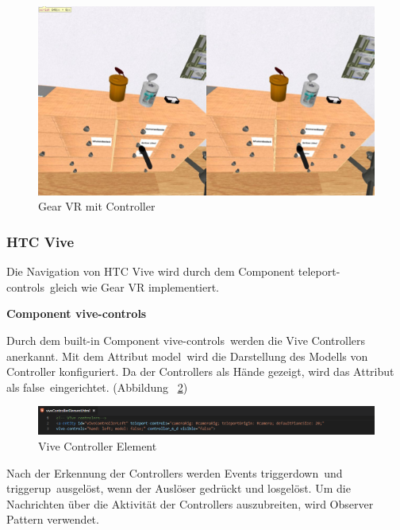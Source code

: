 \begin{figure}[ht]
\vspace*{0.3cm}
\centering
\includegraphics[width=\textwidth]{images/gearVRWithController.png}
\caption[Gear VR mit Controller]{Gear VR mit Controller}
\label{fig:GearVRWithController} 
\end{figure}
  
  \subsubsection{HTC Vive}
  
  Die Navigation von HTC Vive wird durch dem Component \glqq teleport-controls\grqq\ gleich wie Gear VR implementiert.
  
  \textbf{Component vive-controls}
  
  Durch dem built-in Component \glqq vive-controls\grqq\ werden die Vive Controllers anerkannt. Mit dem Attribut \glqq model\grqq\ wird die Darstellung des Modells von Controller konfiguriert. Da der Controllers als Hände gezeigt, wird das Attribut als \glqq false\grqq\ eingerichtet. (Abbildung ~\ref{fig:viveControllerElement})
  
\begin{figure}[ht]
\vspace*{0.3cm}
\centering
\includegraphics[width=\textwidth]{images/viveControllerElement.png}
\caption[Vive Controller Element]{Vive Controller Element}
\label{fig:viveControllerElement} 
\end{figure}
  
  Nach der Erkennung der Controllers werden Events \glqq triggerdown\grqq\ und \glqq triggerup\grqq\ ausgelöst, wenn der Auslöser gedrückt und losgelöst. Um die Nachrichten über die Aktivität der Controllers auszubreiten, wird Observer Pattern verwendet.
  
